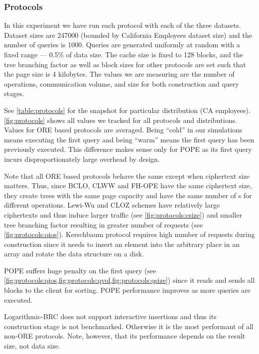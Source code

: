 		\subsubsection{Protocols}\label{sec:results-protocols}

			In this experiment we have run each protocol with each of the three datasets.
			Dataset sizes are 247000 (bounded by California Employees dataset size) and the number of queries is 1000.
			Queries are generated uniformly at random with a fixed range --- 0.5\% of data size.
			The cache size is fixed to 128 blocks, and the {\BPlus} tree branching factor as well as block sizes for other protocols are set such that the page size is 4 kilobytes.
			The values we are measuring are the number of {\IO} operations, communication volume, and size for both construction and query stages.

			See \cref{table:protocols} for the snapshot for particular distribution (CA employees).
			\cref{fig:protocols} shows all values we tracked for all protocols and distributions.
			Values for ORE based protocols are averaged.
			Being ``cold'' in our simulations means executing the first query and being ``warm'' means the first query has been previously executed.
			This difference makes sense only for POPE as its first query incurs disproportionately large overhead by design.

			Note that all ORE based protocols behave the same except when ciphertext size matters.
			Thus, since BCLO, CLWW and FH-OPE have the same ciphertext size, they create {\BPlus} trees with the same page capacity and have the same number of {\IO}s for different operations.
			Lewi-Wu and CLOZ schemes have relatively large ciphertexts and thus induce larger traffic (see \cref{fig:protocols:csize}) and smaller {\BPlus} tree branching factor resulting in greater number of {\IO} requests (see \cref{fig:protocols:qios}).
			Kerschbaum protocol requires high number of {\IO} requests during construction since it needs to insert an element into the arbitrary place in an array and rotate the data structure on a disk.

			POPE suffers huge penalty on the first query (see \cref{fig:protocols:qios,fig:protocols:qvol,fig:protocols:qsize}) since it reads and sends all blocks to the client for sorting.
			POPE performance improves as more queries are executed.

			Logarithmic\hyp{}BRC does not support interactive insertions and thus its construction stage is not benchmarked.
			Otherwise it is the most performant of all non-ORE protocols.
			Note, however, that its performance depends on the result size, not data size.

